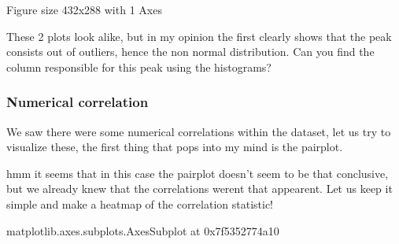 \documentclass[letterpaper,10pt,english]{jupyterBook}
\begin{document}
\begin{sphinxVerbatim}[commandchars=\\\{\}]
\PYGZlt{}Figure size 432x288 with 1 Axes\PYGZgt{}
\end{sphinxVerbatim}

\sphinxAtStartPar
These 2 plots look alike, but in my opinion the first clearly shows that the peak consists out of outliers, hence the non normal distribution. Can you find the column responsible for this peak using the histograms?


\subsubsection{Numerical correlation}
\label{\detokenize{c7_case_studies/Olist:id4}}
\sphinxAtStartPar
We saw there were some numerical correlations within the dataset, let us try to visualize these, the first thing that pops into my mind is the pairplot.

\begin{sphinxVerbatim}[commandchars=\\\{\}]
\end{sphinxVerbatim}

\sphinxAtStartPar
hmm it seems that in this case the pairplot doesn’t seem to be that conclusive, but we already knew that the correlations werent that appearent. Let us keep it simple and make a heatmap of the correlation statistic!

\begin{sphinxVerbatim}[commandchars=\\\{\}]
\PYG{p}{[}  \PYG{p}{]} 
\end{sphinxVerbatim}

\begin{sphinxVerbatim}[commandchars=\\\{\}]
\PYGZlt{}matplotlib.axes.\PYGZus{}subplots.AxesSubplot at 0x7f5352774a10\PYGZgt{}
\end{sphinxVerbatim}
\end{document}
